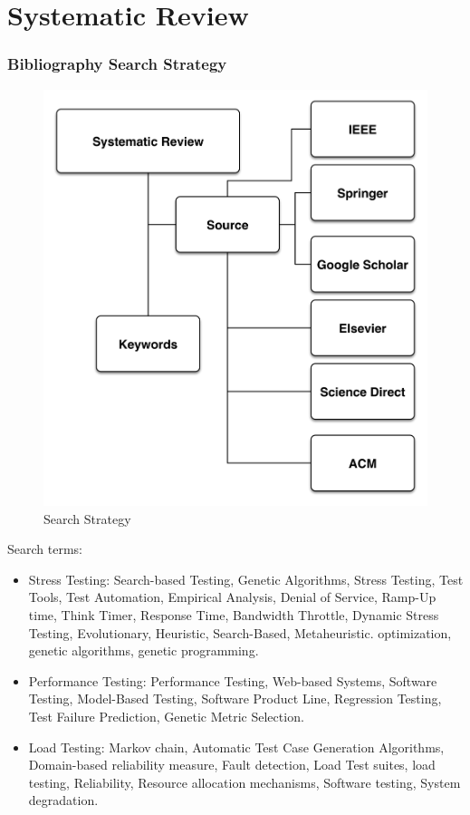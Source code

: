 \documentclass{beamer}
\begin{document}
\section{Systematic Review}


\begin{frame}
\frametitle{Bibliography Search Strategy}
\begin{figure}[H]
\centering
\includegraphics[width=0.5\linewidth]{StateofArt.PNG}
\caption{Search Strategy}
\end{figure}
\end{frame}



\begin{frame}
Search terms:
\begin{itemize}
\item Stress Testing: Search-based Testing, Genetic Algorithms, Stress Testing, Test Tools, Test Automation, Empirical Analysis, Denial of Service, Ramp-Up time, Think Timer,  Response Time, Bandwidth Throttle, Dynamic Stress Testing, Evolutionary, Heuristic, Search-Based, Metaheuristic. optimization, genetic algorithms, genetic programming.

\end{itemize}
\end{frame}



\begin{frame}

\begin{itemize}
\item Performance Testing: Performance Testing, Web-based Systems, Software Testing, Model-Based Testing, Software Product Line, Regression Testing, Test Failure Prediction, Genetic Metric Selection.
\item Load Testing: Markov chain,  Automatic Test Case Generation Algorithms, Domain-based reliability measure, Fault detection, Load Test suites, load testing, Reliability, Resource allocation mechanisms, Software testing, System degradation.
\end{itemize}
\end{frame}
\end{document}
